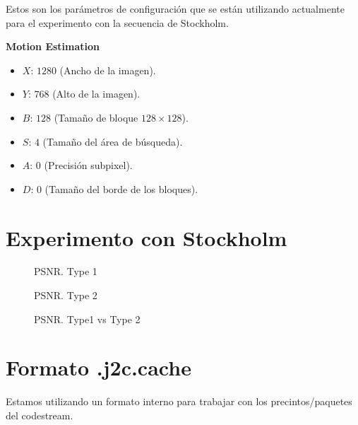 \documentclass[11pt,a4paper]{article}
\begin{document}
Estos son los par\'ametros de configuraci\'on que se est\'an utilizando
actualmente para el experimento con la secuencia de Stockholm.

\textbf{Motion Estimation}

  \begin{itemize}
    \item $X$: $1280$ (Ancho de la imagen).
    \item $Y$: $768$ (Alto de la imagen).
    \item $B$: $128$ (Tama\~no de bloque $128 \times 128$).
    \item $S$: $4$ (Tama\~no del \'area de b\'usqueda).
    \item $A$: $0$ (Precisi\'on subpixel).
    \item $D$: $0$ (Tama\~no del borde de los bloques).
  \end{itemize}

\section{Experimento con Stockholm}

\begin{figure}[h!]
\centering
\resizebox{0.8\textwidth}{!}{
\texttt{[image: benchmark/01\_type1/psnr\_type1.pdf]}}
\caption{PSNR. Type 1}
\label{fig:image1}
\end{figure}

\begin{figure}[h!]
\centering
\resizebox{0.8\textwidth}{!}{
\texttt{[image: benchmark/02\_type2/psnr\_type2.pdf]}}
\caption{PSNR. Type 2}
\label{fig:image2}
\end{figure}

\begin{figure}[h!]
\centering
\resizebox{0.8\textwidth}{!}{
\texttt{[image: benchmark/03\_type1\_vs\_type2/psnr\_type1\_vs\_type2.pdf]}}
\caption{PSNR. Type1 vs Type 2}
\label{fig:image3}
\end{figure}


\section{Formato .j2c.cache}

Estamos utilizando un formato interno para trabajar con los precintos/paquetes del
codestream.
\end{document}
